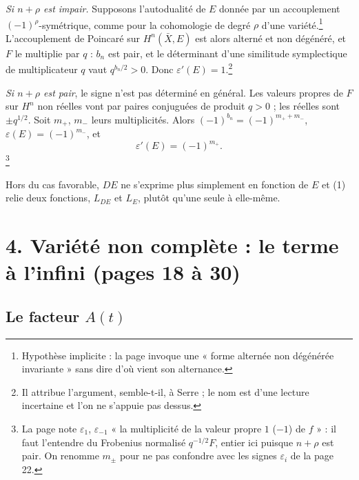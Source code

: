 \documentclass[11pt,a4paper]{article}
\begin{document}
\emph{Si $n + \rho$ est impair.} Supposons l'autodualité de $E$ donnée par un
accouplement $(-1)^\rho$-symétrique, comme pour la cohomologie de degré $\rho$
d'une variété.\footnote{Hypothèse implicite : la page invoque une « forme
alternée non dégénérée invariante » sans dire d'où vient son alternance.}
L'accouplement de Poincaré sur $H^n(\bar X, E)$ est alors alterné et non
dégénéré, et $F$ le multiplie par $q$ : $b_n$ est pair, et le déterminant d'une
similitude symplectique de multiplicateur $q$ vaut $q^{b_n/2} > 0$. Donc
$\varepsilon'(E) = 1$.\footnote{Il attribue l'argument, semble-t-il, à
Serre ; le nom est d'une lecture incertaine et l'on ne s'appuie pas dessus.}

\emph{Si $n + \rho$ est pair}, le signe n'est pas déterminé en général. Les
valeurs propres de $F$ sur $H^n$ non réelles vont par paires conjuguées de
produit $q > 0$ ; les réelles sont $\pm q^{1/2}$. Soit $m_{+}$, $m_{-}$ leurs
multiplicités. Alors $(-1)^{b_n} = (-1)^{m_{+} + m_{-}}$,
$\varepsilon(E) = (-1)^{m_{-}}$, et
\[
  \varepsilon'(E) = (-1)^{m_{+}} .
\]
\footnote{La page note $\varepsilon_1$, $\varepsilon_{-1}$ « la multiplicité de
la valeur propre $1$ ($-1$) de $f$ » : il faut l'entendre du Frobenius
normalisé $q^{-1/2}F$, entier ici puisque $n + \rho$ est pair. On renomme
$m_{\pm}$ pour ne pas confondre avec les signes $\varepsilon_i$ de la page 22.}

Hors du cas favorable, $DE$ ne s'exprime plus simplement en fonction de $E$ et
(1) relie deux fonctions, $L_{DE}$ et $L_E$, plutôt qu'une seule à elle-même.

\section*{4. Variété non complète : le terme à l'infini (pages 18 à 30)}

\subsection*{Le facteur $A(t)$}
\end{document}
